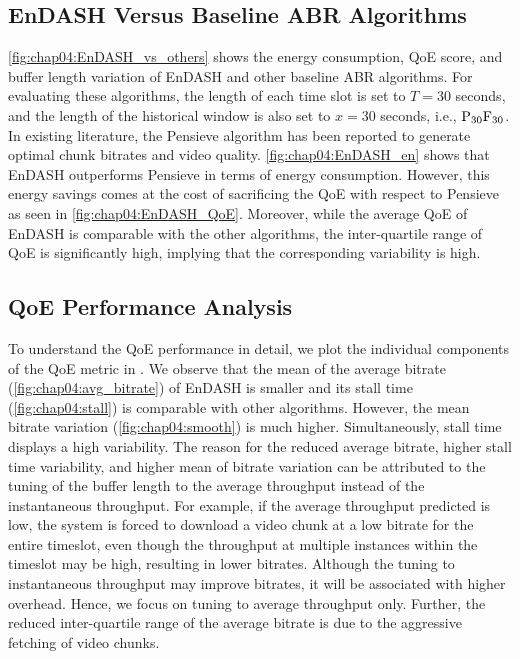 \subsection{EnDASH Versus Baseline ABR Algorithms}
\fig\ref{fig:chap04:EnDASH_vs_others} shows the energy consumption, \ac{QoE} score, and buffer length variation of EnDASH and other baseline \ac{ABR} algorithms. For evaluating these algorithms, the length of each time slot is set to $T=30$ seconds, and the length of the historical window is also set to $x=30$ seconds, i.e., $\mathrm{P_{30}F_{30}}$. %
In existing literature, the Pensieve \cite{mao2017neural} algorithm has been reported to generate optimal chunk bitrates and video quality. \fig\ref{fig:chap04:EnDASH_en} shows that EnDASH outperforms Pensieve in terms of energy consumption. However, this energy savings comes at the cost of sacrificing the \ac{QoE} with respect to Pensieve as seen in \fig\ref{fig:chap04:EnDASH_QoE}. Moreover, while the average QoE of EnDASH is comparable with the other algorithms, the inter-quartile range of \ac{QoE} is significantly high, implying that the corresponding variability is high.
 \subsection{QoE Performance Analysis}
To understand the \ac{QoE} performance in detail, we plot the individual components of the \ac{QoE} metric in \fig{\ref{fig:chap04:indi_QoE}}. We observe that the mean of the average bitrate (\fig\ref{fig:chap04:avg_bitrate}) of EnDASH is smaller and its stall time (\fig\ref{fig:chap04:stall}) is comparable with other algorithms. However, the mean bitrate variation (\fig\ref{fig:chap04:smooth}) is much higher. Simultaneously, stall time displays a high variability. The reason for the reduced average bitrate, higher stall time variability, and higher mean of bitrate variation can be attributed to the tuning of the buffer length to the average throughput instead of the instantaneous throughput. For example, if the average throughput predicted is low, the system is forced to download a video chunk at a low bitrate for the entire timeslot, even though the throughput at multiple instances within the timeslot may be high, resulting in lower bitrates. Although the tuning to instantaneous throughput may improve bitrates, it will be associated with higher overhead. Hence, we focus on tuning to average throughput only. Further, the reduced inter-quartile range of the average bitrate is due to the aggressive fetching of video chunks.
